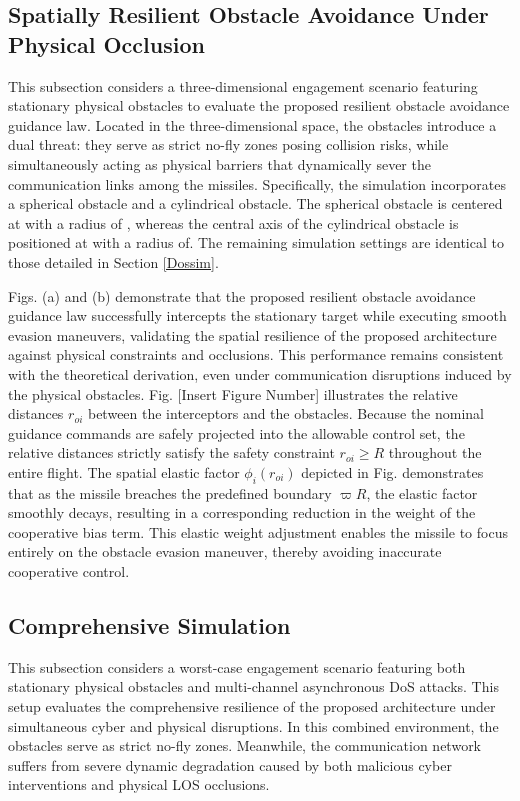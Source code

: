 \documentclass[lettersize,journal]{IEEEtran}
\begin{document}
\subsection{Spatially Resilient Obstacle Avoidance Under Physical Occlusion}
This subsection considers a three-dimensional engagement scenario featuring stationary physical obstacles to evaluate the proposed resilient obstacle avoidance guidance law. Located in the three-dimensional space, the obstacles introduce a dual threat: they serve as strict no-fly zones posing collision risks, while simultaneously acting as physical barriers that dynamically sever the communication links among the missiles. Specifically, the simulation incorporates a spherical obstacle and a cylindrical obstacle. The spherical obstacle is centered at  with a radius of , whereas the central axis of the cylindrical obstacle is positioned at  with a radius of. The remaining simulation settings are identical to those detailed in Section \ref{Dossim}.

Figs. (a) and (b) demonstrate that the proposed resilient obstacle avoidance guidance law successfully intercepts the stationary target while executing smooth evasion maneuvers, validating the spatial resilience of the proposed architecture against physical constraints and occlusions. This performance remains consistent with the theoretical derivation, even under communication disruptions induced by the physical obstacles. Fig. [Insert Figure Number] illustrates the relative distances $r_{oi}$ between the interceptors and the obstacles. Because the nominal guidance commands are safely projected into the allowable control set, the relative distances strictly satisfy the safety constraint $r_{oi} \ge R$ throughout the entire flight. The spatial elastic factor $\phi_i(r_{oi})$ depicted in Fig.  demonstrates that as the missile breaches the predefined boundary $\varpi R$, the elastic factor smoothly decays, resulting in a corresponding reduction in the weight of the cooperative bias term. This elastic weight adjustment enables the missile to focus entirely on the obstacle evasion maneuver, thereby avoiding inaccurate cooperative control.

\subsection{Comprehensive Simulation}

This subsection considers a worst-case engagement scenario featuring both stationary physical obstacles and multi-channel asynchronous DoS attacks. This setup evaluates the comprehensive resilience of the proposed architecture under simultaneous cyber and physical disruptions. In this combined environment, the obstacles serve as strict no-fly zones. Meanwhile, the communication network suffers from severe dynamic degradation caused by both malicious cyber interventions and physical LOS occlusions.
\end{document}
